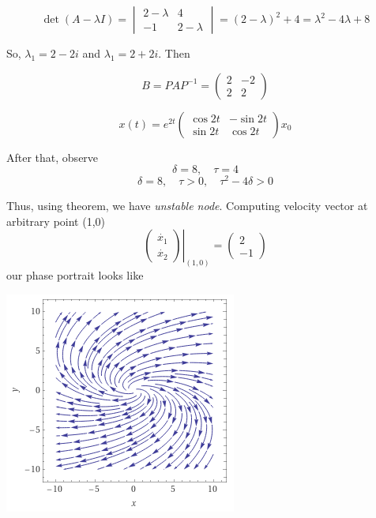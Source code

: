 \documentclass[12pt]{article}
\begin{document}
    $$
        \det (A - \lambda I) = 
        \begin{vmatrix}
            2-\lambda & 4\\
            -1 & 2-\lambda
        \end{vmatrix}
        = (2-\lambda)^2+4
        =\lambda^2 -4\lambda +8
    $$

    So, $\lambda_1 = 2-2i$ and $\lambda_1 = 2+2i$.
    Then
    
    $$
        B = PAP^{-1} =
        \begin{pmatrix}
            2 & -2\\
            2 & 2
        \end{pmatrix}
    $$
    
    $$
        x(t) = e^{2t}
        \begin{pmatrix}
            \cos 2t & -\sin 2t\\
            \sin 2t & \cos 2t
        \end{pmatrix}
        x_0
    $$

    After that, observe
    $$
        \delta = 8,\quad\tau = 4
    $$
    $$
        \delta = 8,\quad\tau > 0,\quad
        \tau^2-4\delta>0
    $$

    Thus, using theorem, we have \textit{unstable node}.
    Computing velocity vector at arbitrary point (1,0)
    $$  
        \left.
        \begin{pmatrix}
            \dot{x_1}\\
            \dot{x_2}
        \end{pmatrix}
        \right\vert_{(1,0)} =
        \begin{pmatrix}
            2\\
            -1
        \end{pmatrix}
    $$
    our phase portrait looks like
    
    \begin{center}
        \includegraphics{plot2.png}
    \end{center}
\end{document}
